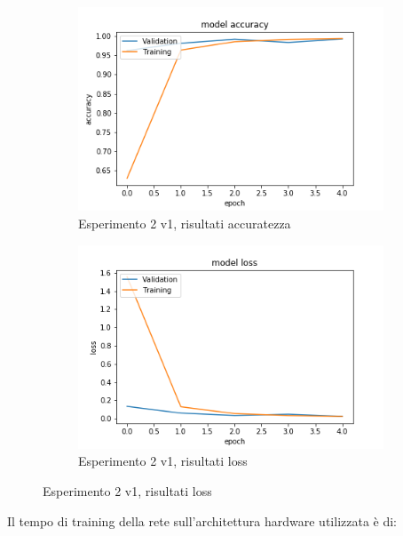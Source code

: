 \begin{figure}[H]
    \begin{subfigure}[b]{0.5\textwidth}
        \includegraphics[width=\textwidth]{./plots/exp2_p1_acc.png}
        \caption{Esperimento 2 v1, risultati accuratezza} 
        \label{fig:plot_exp2_p1_acc}
    \end{subfigure}
    \begin{subfigure}[b]{0.5\textwidth}
        \includegraphics[width=\textwidth]{./plots/exp2_p1_loss.png}
        \caption{Esperimento 2 v1, risultati loss} 
        \label{fig:plot_exp2_p1_loss}
	\end{subfigure}
\end{figure}
Il tempo di training della rete sull'architettura hardware utilizzata è di:

